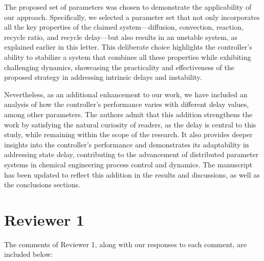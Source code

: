 \documentclass[12pt,answers]{exam}
\begin{document}
The proposed set of parameters was chosen to demonstrate the applicability of our approach. Specifically, we selected a parameter set that not only incorporates all the key properties of the claimed system—diffusion, convection, reaction, recycle ratio, and recycle delay—but also results in an unstable system, as explained earlier in this letter. This deliberate choice highlights the controller's ability to stabilize a system that combines all these properties while exhibiting challenging dynamics, showcasing the practicality and effectiveness of the proposed strategy in addressing intrinsic delays and instability.

Nevertheless, as an additional enhancement to our work, we have included an analysis of how the controller’s performance varies with different delay values, among other parameters. The authors admit that this addition strengthens the work by satisfying the natural curiosity of readers, as the delay is central to this study, while remaining within the scope of the research. It also provides deeper insights into the controller’s performance and demonstrates its adaptability in addressing state delay, contributing to the advancement of distributed parameter systems in chemical engineering process control and dynamics. The manuscript has been updated to reflect this addition in the results and discussions, as well as the conclusions sections.

\newpage

\section*{Reviewer 1}

The comments of Reviewer 1, along with our responses to each comment, are included below:

\begin{quote}
\end{quote}
\end{document}
